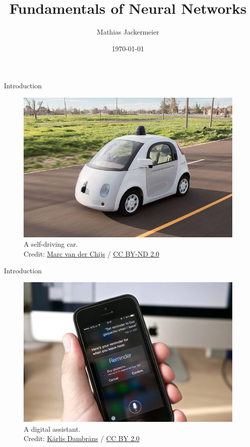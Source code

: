 \documentclass{beamer}
\title{Fundamentals of Neural Networks}
\date{\today}
\author{Mathias Jackermeier}
\institute{Technische Universität München}
\begin{document}
	\maketitle
	\begin{frame}{Introduction}
	\begin{figure}
		\includegraphics[scale=.4]{img/self_driving}
		\caption{A self-driving car. \\Credit: 
			\href{https://www.flickr.com/photos/chijs/21798665468/in/photolist-zdgRMN-HzGNh8-gTzd3u-o5Zrtr-dLznp8-rntpFL-FnbXbs-Hap7Do-9o1FrD-GE5zz3-G9tVGQ-GhD21n-eb2sof-cDdb3y-Gfm7Po-NZGQ3J-GEawvr-FSwEH9-Fnc15o-zhGLV-GbMR1r-FnnkQp-Gfm7CG-eE2tFc-GbMRjx-GbMSe8-9mUNbt-CJdtas}{Marc van der Chijs}
			 / \href{https://creativecommons.org/licenses/by-nd/2.0/}{CC BY-ND 2.0}}
	\end{figure}
	\end{frame}
	\begin{frame}{Introduction}
		\begin{figure}
			\includegraphics[scale=.25]{img/siri}
			\caption{A digital assistant. \\Credit: 
				\href{https://www.flickr.com/photos/65265630@N03/13989720008}{Kārlis Dambrāns} / \href{https://creativecommons.org/licenses/by/2.0/}{CC BY 2.0}}
		\end{figure}
	\end{frame}
\end{document}
